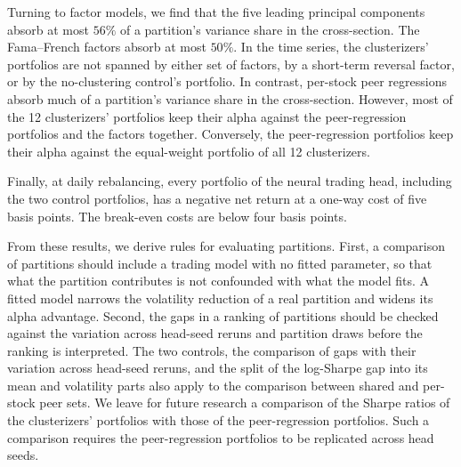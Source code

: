 Turning to factor models, we find that the five leading principal components absorb at most $56\%$ of a partition's variance share in the cross-section. The Fama--French factors absorb at most $50\%$. In the time series, the clusterizers' portfolios are not spanned by either set of factors, by a short-term reversal factor, or by the no-clustering control's portfolio. In contrast, per-stock peer regressions absorb much of a partition's variance share in the cross-section. However, most of the 12 clusterizers' portfolios keep their alpha against the peer-regression portfolios and the factors together. Conversely, the peer-regression portfolios keep their alpha against the equal-weight portfolio of all 12 clusterizers.

Finally, at daily rebalancing, every portfolio of the neural trading head, including the two control portfolios, has a negative net return at a one-way cost of five basis points. The break-even costs are below four basis points.

From these results, we derive rules for evaluating partitions. First, a comparison of partitions should include a trading model with no fitted parameter, so that what the partition contributes is not confounded with what the model fits. A fitted model narrows the volatility reduction of a real partition and widens its alpha advantage. Second, the gaps in a ranking of partitions should be checked against the variation across head-seed reruns and partition draws before the ranking is interpreted. The two controls, the comparison of gaps with their variation across head-seed reruns, and the split of the log-Sharpe gap into its mean and volatility parts also apply to the comparison between shared and per-stock peer sets. We leave for future research a comparison of the Sharpe ratios of the clusterizers' portfolios with those of the peer-regression portfolios. Such a comparison requires the peer-regression portfolios to be replicated across head seeds.

